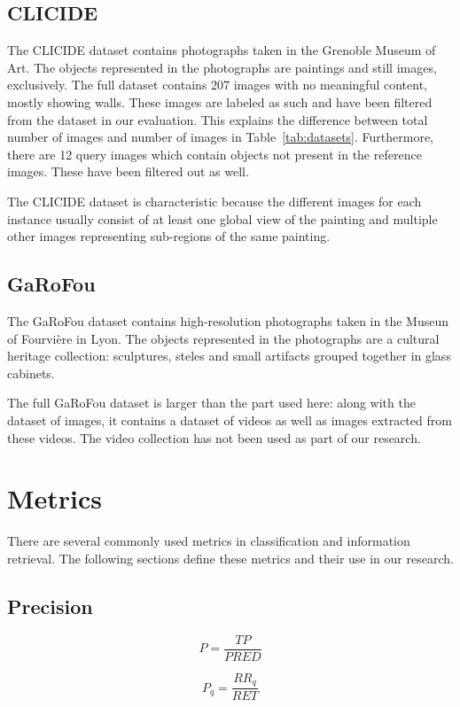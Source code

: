 \subsection{CLICIDE}
The CLICIDE dataset contains photographs taken in the Grenoble Museum of Art.
The objects represented in the photographs are paintings and still images,
exclusively. The full dataset contains 207 images with no meaningful content,
mostly showing walls. These images are labeled as such and have been filtered
from the dataset in our evaluation. This explains the difference between
total number of images and number of images in Table~\ref{tab:datasets}.
Furthermore, there are 12 query images which contain objects not
present in the reference images. These have been filtered out as well.

The CLICIDE dataset is characteristic because the different images
for each instance usually consist of at least one global view of the
painting and multiple other images representing sub-regions of the
same painting.

\subsection{GaRoFou}
The GaRoFou dataset contains high-resolution photographs taken in the
Museun of Fourvière in Lyon. The objects represented in the photographs
are a cultural heritage collection: sculptures, steles and small artifacts
grouped together in glass cabinets.

The full GaRoFou dataset is larger than the part used here: along with
the dataset of images, it contains a dataset of videos as well as images
extracted from these videos. The video collection has not been used as
part of our research.

\section{Metrics}
There are several commonly used metrics in classification and information
retrieval. The following sections define these metrics and their use
in our research.

\subsection{Precision}\label{sec:precision}
\begin{equation}\label{eq:preccls}
P = \frac{TP}{PRED}
\end{equation}

\begin{equation}\label{eq:precir}
P_q = \frac{RR_q}{RET}
\end{equation}

